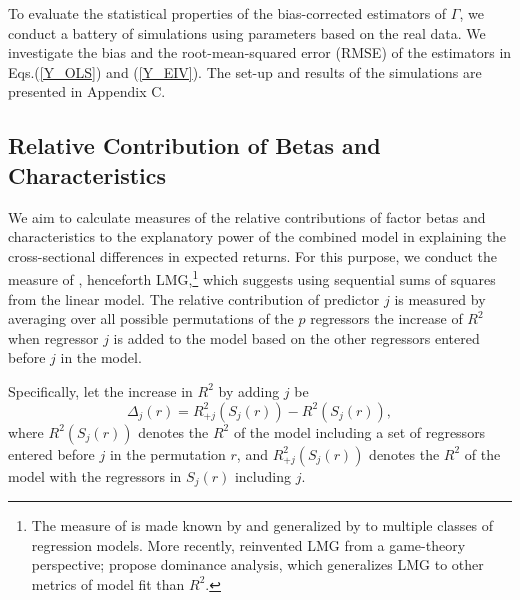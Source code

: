 \par To evaluate the statistical properties of the bias-corrected estimators of $\Gamma$, we conduct a battery of simulations using parameters based on the real data. We investigate the bias and the root-mean-squared error (RMSE) of the estimators in Eqs.(\ref{Y_OLS}) and (\ref{Y_EIV}). The set-up and results of the simulations are presented in Appendix C.   

\subsection{Relative Contribution of Betas and Characteristics}
We aim to calculate measures of the relative contributions of factor betas and characteristics to the explanatory power of the combined model in explaining the cross-sectional differences in expected returns. For this purpose, we conduct the measure of \citet{lindeman1980introduction}, henceforth LMG,\footnote{The measure of \citet{lindeman1980introduction} is made known by \citet{kruskal1987relative} and generalized by \citet{chevan1991hierarchical} to multiple classes of regression models. More recently, \citet{lipovetsky2001analysis} reinvented LMG from a game-theory perspective; \citet{azen2003dominance} propose dominance analysis, which generalizes LMG to other metrics of model fit than $R^2$.} which suggests using sequential sums of squares from the linear model. The relative contribution of predictor $j$ is measured by averaging over all possible permutations of the $p$ regressors the increase of $R^2$ when regressor $j$ is added to the model based on the other regressors entered before $j$ in the model.
\par Specifically, let the increase in $R^2$ by adding $j$ be
\begin{equation}
    \label{R2diff}
    \Delta_j(r) = R^2_{+j}(S_j(r)) - R^2(S_j(r)),
\end{equation}
where $R^2(S_j(r))$ denotes the $R^2$ of the model including a set of regressors entered before $j$ in the permutation $r$, and $R^2_{+j}(S_j(r))$ denotes the $R^2$ of the model with the regressors in $S_j(r)$ including $j$. 

